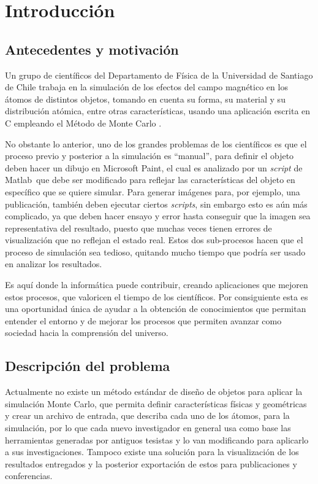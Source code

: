 \chapter{Introducci\'on}
\label{cap:intro}

\section{Antecedentes y motivaci\'on}
\label{intro:motivacion}

Un grupo de científicos del Departamento de Física de la Universidad de Santiago de Chile trabaja en la simulación de los efectos del campo magnético en los átomos de distintos objetos, tomando en cuenta su forma, su material y su distribución atómica, entre otras características, usando una aplicación escrita en C empleando el Método de Monte Carlo \citep{MonteCarlo}.

No obstante lo anterior, uno de los grandes problemas de los científicos es que el proceso previo y posterior a la simulación es ``manual'', para definir el objeto deben hacer un dibujo en Microsoft Paint\textregistered, el cual es analizado por un \emph{script} de Matlab\textregistered\ que debe ser modificado para reflejar las características del objeto en específico que se quiere simular. Para generar imágenes para, por ejemplo, una publicación, también deben ejecutar ciertos \emph{scripts}, sin embargo esto es aún más complicado, ya que deben hacer ensayo y error hasta conseguir que la imagen sea representativa del resultado, puesto que muchas veces tienen errores de visualización que no reflejan el estado real. Estos dos sub-procesos hacen que el proceso de simulación sea tedioso, quitando mucho tiempo que podría ser usado en analizar los resultados.

Es aquí donde la informática puede contribuir, creando aplicaciones que mejoren estos procesos, que valoricen el tiempo de los científicos. Por consiguiente esta es una oportunidad única de ayudar a la obtención de conocimientos que permitan entender el entorno y de mejorar los procesos que permiten avanzar como sociedad hacia la comprensión del universo.


\section{Descripci\'on del problema}
\label{intro:problema}

Actualmente no existe un método estándar de diseño de objetos para aplicar la simulación Monte Carlo, que permita definir características físicas y geométricas y crear un archivo de entrada, que describa cada uno de los átomos, para la simulación, por lo que cada nuevo investigador en general usa como base las herramientas generadas por antiguos tesistas y lo van modificando para aplicarlo a sus investigaciones. Tampoco existe una solución para la visualización de los resultados entregados y la posterior exportación de estos para publicaciones y conferencias.

